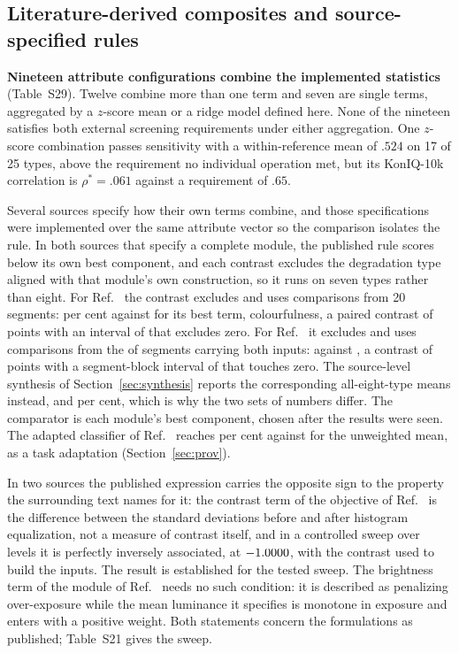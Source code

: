 \subsection{Literature-derived composites and source-specified rules}\label{sec:combinations}

\textbf{Nineteen attribute configurations combine the implemented statistics} (Table~S29). Twelve
combine more than one term and seven are single terms, aggregated by a $z$-score mean or a ridge model defined here. None of the nineteen satisfies both external screening
requirements under either aggregation. One $z$-score combination passes sensitivity with
a within-reference mean of $.524$ on 17 of 25 types, above the requirement no
individual operation met, but its KonIQ-10k correlation is $\rho^{*}=.061$ against a
requirement of $.65$.

Several sources specify how their own terms combine, and those specifications were
implemented over the same attribute vector so the comparison isolates the rule.
In both sources that specify a complete module, the published rule scores below
its own best component, and each contrast excludes the degradation type aligned
with that module's own construction, so it runs on seven types rather than eight. For Ref.~\citep{qaroush2025diversity} the contrast excludes \vaTipoFora{} and uses \vaPares{}
comparisons from 20 segments: \vaModulo{} per cent against \vaMelhorMembro{} for its best
term, colourfulness, a paired contrast of \vaContraste{} points with an interval of \vaIC{} that excludes
zero. For Ref.~\citep{korolkov2025keyframe} it excludes \koTipoFora{} and uses \koPares{}
comparisons from the \koN{} of \koDe{} segments carrying both inputs: \koModulo{} against
\koMelhorMembro{}, a contrast of \koContraste{} points with a segment-block interval of
\koIC{} that touches zero. The source-level synthesis of Section~\ref{sec:synthesis} reports the corresponding
all-eight-type means instead, \vaMediaOito{} and \koMediaOito{} per cent, which is why the
two sets of numbers differ. The comparator is each module's best component, chosen after the results were seen. The adapted classifier of Ref.~\citep{ke2006highlevel} reaches \regraKe{} per cent against \regraMedia{}
for the unweighted mean, as a task adaptation (Section~\ref{sec:prov}).

In two sources the published expression carries the opposite sign to the property
the surrounding text names for it: the contrast term of the objective of Ref.~\citep{qaroush2025diversity} is the difference between the standard deviations before and after histogram equalization, not a measure of contrast itself, and in a controlled sweep over \ctNiveis{} levels it is perfectly inversely associated, at $-1.0000{}$, with the contrast used to build the inputs. The result is established for the tested sweep. The
brightness term of the module of Ref.~\citep{korolkov2025keyframe} needs no such condition: it is described as
penalizing over-exposure while the mean luminance it specifies is monotone in exposure and
enters with a positive weight. Both statements concern the formulations as published; Table~S21 gives the sweep.

